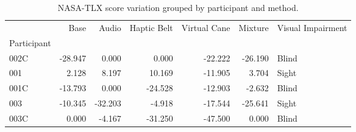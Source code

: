 
\begin{table}[!htb]
\centering
\caption{NASA-TLX score variation grouped by participant and method.}
\label{tab:nasa_var}
\begin{tabular}{lrrrrrl}
\toprule
{} &    Base &   Audio &  Haptic Belt &  Virtual Cane &  Mixture & Visual Impairment \\
Participant &         &         &              &               &          &                   \\
\midrule
002C        & -28.947 &   0.000 &        0.000 &       -22.222 &  -26.190 &             Blind \\
001         &   2.128 &   8.197 &       10.169 &       -11.905 &    3.704 &             Sight \\
001C        & -13.793 &   0.000 &      -24.528 &       -12.903 &   -2.632 &             Blind \\
003         & -10.345 & -32.203 &       -4.918 &       -17.544 &  -25.641 &             Sight \\
003C        &   0.000 &  -4.167 &      -31.250 &       -47.500 &    0.000 &             Blind \\
\bottomrule
\end{tabular}
\end{table}


